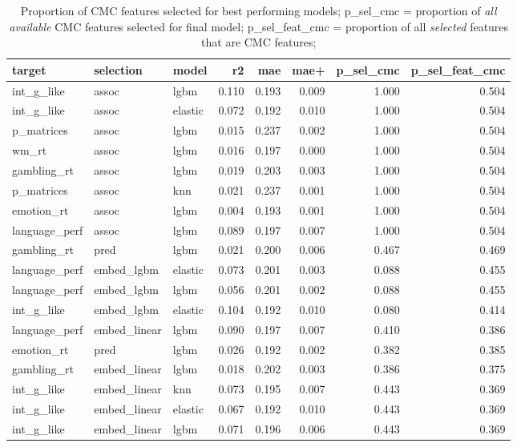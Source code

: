 \documentclass{article}
\begin{document}
\begin{table}[H]
\caption{Proportion of CMC features selected for best performing models;
p\_sel\_cmc = proportion of \emph{all available} CMC features selected for final model;
p\_sel\_feat\_cmc = proportion of all \emph{selected} features that are CMC features;
}
\centering
\begin{tabular}{lllrrrrr}
	\toprule
	target & selection & model & r2 & mae & mae+ & p\_sel\_cmc & p\_sel\_feat\_cmc \\
	\midrule
	int\_g\_like & assoc & lgbm & 0.110 & 0.193 & 0.009 & 1.000 & 0.504 \\
	int\_g\_like & assoc & elastic & 0.072 & 0.192 & 0.010 & 1.000 & 0.504 \\
	p\_matrices & assoc & lgbm & 0.015 & 0.237 & 0.002 & 1.000 & 0.504 \\
	wm\_rt & assoc & lgbm & 0.016 & 0.197 & 0.000 & 1.000 & 0.504 \\
	gambling\_rt & assoc & lgbm & 0.019 & 0.203 & 0.003 & 1.000 & 0.504 \\
	p\_matrices & assoc & knn & 0.021 & 0.237 & 0.001 & 1.000 & 0.504 \\
	emotion\_rt & assoc & lgbm & 0.004 & 0.193 & 0.001 & 1.000 & 0.504 \\
	language\_perf & assoc & lgbm & 0.089 & 0.197 & 0.007 & 1.000 & 0.504 \\
	gambling\_rt & pred & lgbm & 0.021 & 0.200 & 0.006 & 0.467 & 0.469 \\
	language\_perf & embed\_lgbm & elastic & 0.073 & 0.201 & 0.003 & 0.088 & 0.455 \\
	language\_perf & embed\_lgbm & lgbm & 0.056 & 0.201 & 0.002 & 0.088 & 0.455 \\
	int\_g\_like & embed\_lgbm & elastic & 0.104 & 0.192 & 0.010 & 0.080 & 0.414 \\
	language\_perf & embed\_linear & lgbm & 0.090 & 0.197 & 0.007 & 0.410 & 0.386 \\
	emotion\_rt & pred & lgbm & 0.026 & 0.192 & 0.002 & 0.382 & 0.385 \\
	gambling\_rt & embed\_linear & lgbm & 0.018 & 0.202 & 0.003 & 0.386 & 0.375 \\
	int\_g\_like & embed\_linear & knn & 0.073 & 0.195 & 0.007 & 0.443 & 0.369 \\
	int\_g\_like & embed\_linear & elastic & 0.067 & 0.192 & 0.010 & 0.443 & 0.369 \\
	int\_g\_like & embed\_linear & lgbm & 0.071 & 0.196 & 0.006 & 0.443 & 0.369 \\

\end{tabular}
\end{table}
\end{document}
